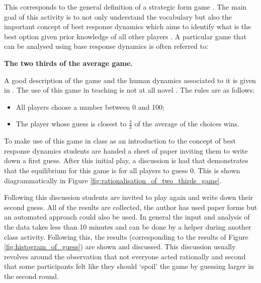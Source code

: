 \documentclass[12pt, a4paper]{article}
\begin{document}
This corresponds to the general definition of a strategic form game
\cite{Maschler2013}. The main goal of this activity is to not only understand
the vocabulary but also the important concept of best response dynamics which
aims to identify what is the best option given prior knowledge of all other
players \cite{Maschler2013}. A particular game that can be analysed using base
response dynamics is often referred to:

\begin{center}
    \textbf{The two thirds of the average game.}
\end{center}

A good description of the game and the human dynamics associated to it is given
in \cite{Nagel1995}.  The use of this game in teaching is not at all novel
\cite{TheEconomicsNetwork2013}. The rules are as follows:

\begin{itemize}
    \item All players choose a number between 0 and 100;
    \item The player whose guess is closest to \(\frac{2}{3}\) of the average
        of the choices wins.
\end{itemize}

To make use of this game in class as an introduction to the concept of best
response dynamics students are handed a sheet of paper inviting them to write
down a first guess. After this initial play, a discussion is had that
demonstrates that the equilibrium for this game is for all players to guess 0.
This is shown diagrammatically in Figure
\ref{fig:rationalisation_of_two_thirds_game}.

Following this discussion students are invited to play again and write down
their second guess. All of the results are collected, the author has used paper
forms but an automated approach could also be used. In general the input and
analysis of the data takes less than 10 minutes and can be done by a helper
during another class activity.
Following this, the results (corresponding to the results of Figure
\ref{fig:histogram_of_guess}) are shown and discussed.
This discussion usually revolves around the observation that not everyone acted
rationally and second that some participants felt like they should `spoil' the
game by guessing larger in the second round.
\end{document}
